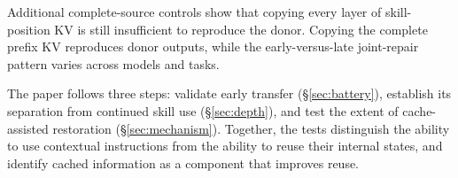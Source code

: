 Additional complete-source controls show that copying every layer of skill-position KV is still insufficient to reproduce the donor. Copying the complete prefix KV reproduces donor outputs, while the early-versus-late joint-repair pattern varies across models and tasks.

The paper follows three steps: validate early transfer
(\S\ref{sec:battery}), establish its separation from continued skill use
(\S\ref{sec:depth}), and test the extent of cache-assisted restoration
(\S\ref{sec:mechanism}). Together, the tests distinguish the ability to
use contextual instructions from the ability to reuse their internal
states, and identify cached information as a component that improves reuse.
